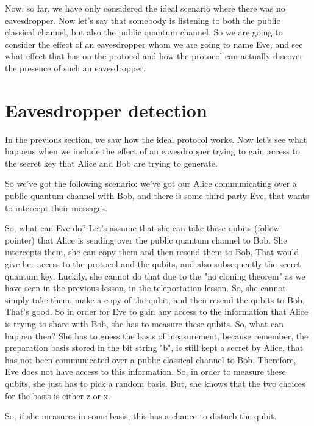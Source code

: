 Now, so far, we have only considered the ideal scenario where there was no eavesdropper. Now let's say that somebody is listening to both the public classical channel, but also the public quantum channel. So we are going to consider the effect of an eavesdropper whom we are going to name Eve, and see what effect that has on the protocol and how the protocol can actually discover the presence of such an eavesdropper.



\section{Eavesdropper detection}

In the previous section, we saw how the ideal protocol works. Now let's see what happens when we include the effect of an eavesdropper trying to gain access to the secret key that Alice and Bob are trying to generate.

So we've got the following scenario: we've got our Alice communicating over a public quantum channel with Bob, and there is some third party Eve, that wants to intercept their messages.

So, what can Eve do? Let's assume that she can take these qubits (follow pointer) that Alice is sending over the public quantum channel to Bob. She intercepts them, she can copy them and then resend them to Bob. That would give her access to the protocol and the qubits, and also subsequently the secret quantum key. Luckily, she cannot do that due to the "no cloning theorem" as we have seen in the previous lesson, in the teleportation lesson. So, she cannot simply take them, make a copy of the qubit, and then resend the qubits to Bob. That's good. So in order for Eve to gain any access to the information that Alice is trying to share with Bob, she has to measure these qubits. So, what can happen then? She has to guess the basis of measurement, because remember, the preparation basis stored in the bit string "b", is still kept a secret by Alice, that has not been communicated over a public classical channel to Bob. Therefore, Eve does not have access to this information. So, in order to measure these qubits, she just has to pick a random basis. But, she knows that the two choices for the basis is either z or x.

So, if she measures in some basis, this has a chance to disturb the qubit.

